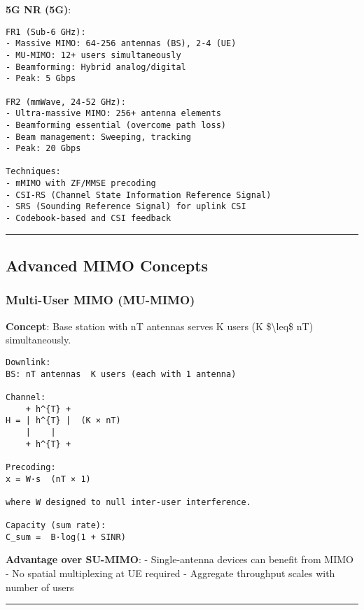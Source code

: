\textbf{5G NR (5G)}:

\begin{verbatim}
FR1 (Sub-6 GHz):
- Massive MIMO: 64-256 antennas (BS), 2-4 (UE)
- MU-MIMO: 12+ users simultaneously
- Beamforming: Hybrid analog/digital
- Peak: 5 Gbps

FR2 (mmWave, 24-52 GHz):
- Ultra-massive MIMO: 256+ antenna elements
- Beamforming essential (overcome path loss)
- Beam management: Sweeping, tracking
- Peak: 20 Gbps

Techniques:
- mMIMO with ZF/MMSE precoding
- CSI-RS (Channel State Information Reference Signal)
- SRS (Sounding Reference Signal) for uplink CSI
- Codebook-based and CSI feedback
\end{verbatim}

\begin{center}\rule{0.5\linewidth}{0.5pt}\end{center}

\subsection{\texorpdfstring{ Advanced MIMO
Concepts}{ Advanced MIMO Concepts}}\label{advanced-mimo-concepts}

\subsubsection{Multi-User MIMO (MU-MIMO)}\label{multi-user-mimo-mu-mimo}

\textbf{Concept}: Base station with nT antennas serves K users (K
\$\textbackslash leq\$ nT) simultaneously.

\begin{verbatim}
Downlink:
BS: nT antennas  K users (each with 1 antenna)

Channel:
    + h^{T} +
H = | h^{T} |  (K × nT)
    |    |
    + h^{T} +

Precoding:
x = W·s  (nT × 1)

where W designed to null inter-user interference.

Capacity (sum rate):
C_sum =  B·log(1 + SINR)
\end{verbatim}

\textbf{Advantage over SU-MIMO}: - Single-antenna devices can benefit
from MIMO - No spatial multiplexing at UE required - Aggregate
throughput scales with number of users

\begin{center}\rule{0.5\linewidth}{0.5pt}\end{center}


